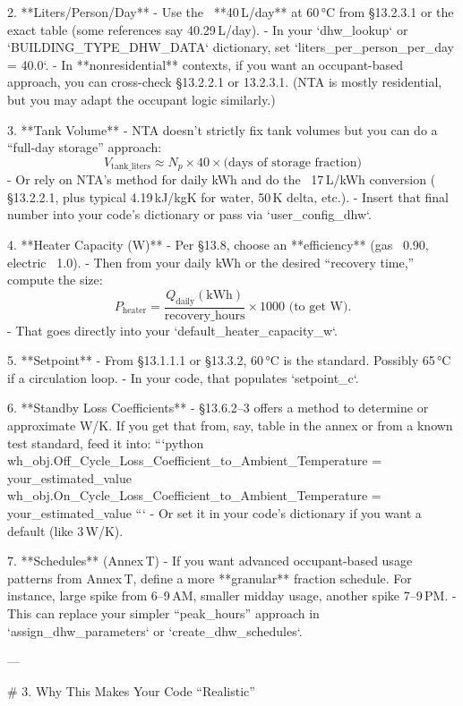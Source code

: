 2. **Liters/Person/Day**  
   - Use the ~**40 L/day** at 60 °C from \S13.2.3.1 or the exact table (some references say 40.29 L/day).  
   - In your `dhw_lookup` or `BUILDING_TYPE_DHW_DATA` dictionary, set `liters_per_person_per_day = 40.0`.  
   - In **nonresidential** contexts, if you want an occupant-based approach, you can cross-check \S13.2.2.1 or 13.2.3.1. (NTA is mostly residential, but you may adapt the occupant logic similarly.)

3. **Tank Volume**  
   - NTA doesn’t strictly fix tank volumes but you can do a “full-day storage” approach:  
     \[
       V_{\text{tank\_liters}} \approx N_{p} \times 40 \times \text{(days of storage fraction)}
     \]  
   - Or rely on NTA’s method for daily kWh and do the ~17 L/kWh conversion ( \S13.2.2.1, plus typical 4.19 kJ/kgK for water, 50 K delta, etc.).  
   - Insert that final number into your code’s dictionary or pass via `user_config_dhw`.

4. **Heater Capacity (W)**  
   - Per \S13.8, choose an **efficiency** (gas ~0.90, electric ~1.0).  
   - Then from your daily kWh or the desired “recovery time,” compute the size:  
     \[
       P_{\text{heater}} = 
         \frac{Q_{\text{daily}}(\text{kWh})}{\text{recovery\_hours}} 
         \times 1000 \text{ (to get W)}.
     \]  
   - That goes directly into your `default_heater_capacity_w`.

5. **Setpoint**  
   - From \S13.1.1.1 or \S13.3.2, 60 °C is the standard. Possibly 65 °C if a circulation loop.  
   - In your code, that populates `setpoint_c`.

6. **Standby Loss Coefficients**  
   - \S13.6.2–3 offers a method to determine or approximate W/K. If you get that from, say, table in the annex or from a known test standard, feed it into:  
     ```python
     wh_obj.Off_Cycle_Loss_Coefficient_to_Ambient_Temperature = your_estimated_value
     wh_obj.On_Cycle_Loss_Coefficient_to_Ambient_Temperature  = your_estimated_value
     ```
   - Or set it in your code’s dictionary if you want a default (like 3 W/K).

7. **Schedules** (Annex T)  
   - If you want advanced occupant-based usage patterns from Annex T, define a more **granular** fraction schedule. For instance, large spike from 6–9 AM, smaller midday usage, another spike 7–9 PM.  
   - This can replace your simpler “peak_hours” approach in `assign_dhw_parameters` or `create_dhw_schedules`.

---

# 3. Why This Makes Your Code “Realistic”

